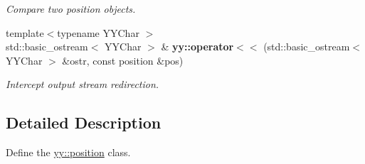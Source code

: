 \begin{DoxyCompactItemize}
\begin{DoxyCompactList}\small\item\em Compare two position objects. \end{DoxyCompactList}\item 
{\footnotesize template$<$typename Y\-Y\-Char $>$ }\\std\-::basic\-\_\-ostream$<$ Y\-Y\-Char $>$ \& {\bfseries yy\-::operator$<$$<$} (std\-::basic\-\_\-ostream$<$ Y\-Y\-Char $>$ \&ostr, const position \&pos)
\begin{DoxyCompactList}\small\item\em Intercept output stream redirection. \end{DoxyCompactList}\end{DoxyCompactItemize}


\subsection{Detailed Description}
Define the \hyperlink{classyy_1_1position}{yy\-::position} class. 